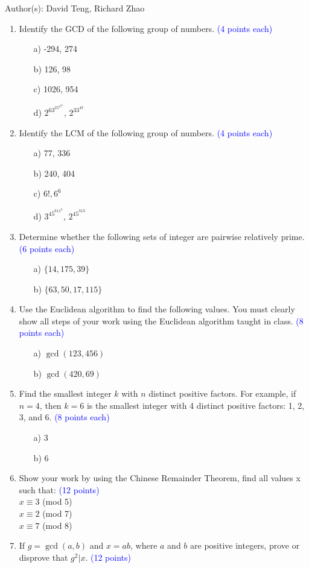 \documentclass{article}
\newcommand{\pt}[1]{\textcolor{blue}{(#1 points)}}
\newcommand{\pte}[1]{\textcolor{blue}{(#1 points each)}}
\begin{document}
Author(s): David Teng, Richard Zhao
\newpage
\begin{enumerate}

\item Identify the GCD of the following group of numbers. \pte{4}
\begin{enumerate}
    \item[a)] -294, 274
    \item[b)] 126, 98
    \item[c)] 1026, 954
    \item[d)] $2^63^25^47^2$, $2^33^47$
\end{enumerate}

\item Identify the LCM of the following group of numbers. \pte{4}
\begin{enumerate}
    \item[a)] 77, 336
    \item[b)] 240, 404
    \item[c)] $6!, 6^6$
    \item[d)] $3^45^611^2$, $2^45^313$
\end{enumerate}

\item Determine whether the following sets of integer are pairwise relatively prime. \pte{6}
\begin{enumerate}
    \item[a)] $\{14, 175, 39\}$
    \item[b)] $\{63, 50, 17, 115\}$
\end{enumerate}

\item Use the Euclidean algorithm to find the following values. You must clearly show all steps of your work using the Euclidean algorithm taught in class. \pte{8}
\begin{enumerate}
    \item[a)] $\gcd(123, 456)$
    \item[b)] $\gcd(420, 69)$ %
\end{enumerate}

\item Find the smallest integer $k$ with $n$ distinct positive factors. For example, if $n = 4$, then $k = 6$ is the smallest integer with 4 distinct positive factors: 1, 2, 3, and 6. \pte{8}

\begin{enumerate}
    \item[a)] 3
    \item[b)] 6
\end{enumerate}

\item Show your work by using the Chinese Remainder Theorem, find all values x such that: \pt{12}\\
$x \equiv 3$ (mod 5) \\$x \equiv 2$ (mod 7)\\$x \equiv 7$ (mod 8) 

\item If $g = \gcd(a, b)$ and $x = ab$, where $a$ and $b$ are positive integers, prove or disprove that $g^2 | x$. \pt{12}

\end{enumerate}
\end{document}
